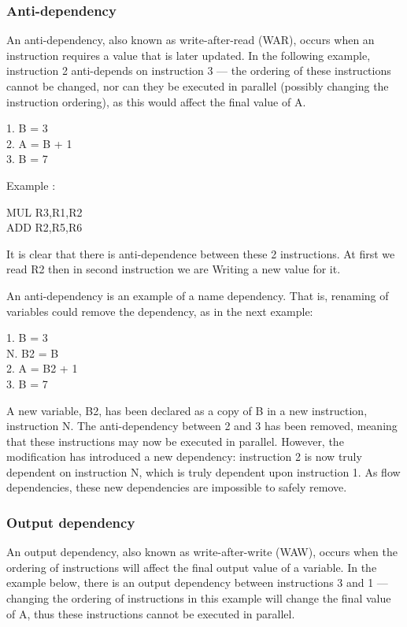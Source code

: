\subsubsection{Anti-dependency}
An anti-dependency, also known as write-after-read (WAR), occurs when an instruction requires a value that is later updated. In the following example, instruction 2 anti-depends on instruction 3 — the ordering of these instructions cannot be changed, nor can they be executed in parallel (possibly changing the instruction ordering), as this would affect the final value of A.
\begin{center}
	1. B = 3 \\
	2. A = B + 1 \\
	3. B = 7
\end{center}

Example :
\begin{center}
	MUL R3,R1,R2 \\
	ADD R2,R5,R6
\end{center}
It is clear that there is anti-dependence between these 2 instructions. At first we read R2 then in second instruction we are Writing a new value for it.

An anti-dependency is an example of a name dependency. That is, renaming of variables could remove the dependency, as in the next example:
\begin{center}
	1. B = 3 \\
	N. B2 = B \\
	2. A = B2 + 1 \\
	3. B = 7
\end{center}
A new variable, B2, has been declared as a copy of B in a new instruction, instruction N. The anti-dependency between 2 and 3 has been removed, meaning that these instructions may now be executed in parallel. However, the modification has introduced a new dependency: instruction 2 is now truly dependent on instruction N, which is truly dependent upon instruction 1. As flow dependencies, these new dependencies are impossible to safely remove.

\subsubsection{Output dependency}

An output dependency, also known as write-after-write (WAW), occurs when the ordering of instructions will affect the final output value of a variable. In the example below, there is an output dependency between instructions 3 and 1 — changing the ordering of instructions in this example will change the final value of A, thus these instructions cannot be executed in parallel.

